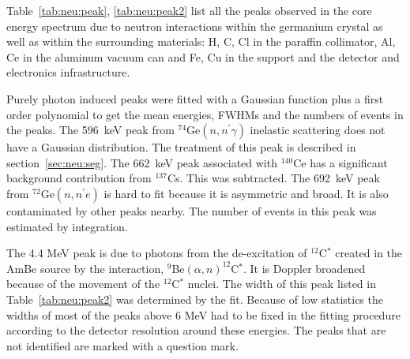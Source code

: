Table~\ref{tab:neu:peak}, \ref{tab:neu:peak2} list all the peaks observed in the core energy spectrum due to neutron interactions within the germanium crystal as well as within the surrounding materials: H, C, Cl in the paraffin collimator, Al, Ce in the aluminum vacuum can and Fe, Cu in the support and the detector and electronics infrastructure.

Purely photon induced peaks were fitted with a Gaussian function plus a first order polynomial to get the mean energies, FWHMs and the numbers of events in the peaks. The 596~keV peak from $^{74}$Ge$(n, n^\prime \gamma)$ inelastic scattering does not have a Gaussian distribution. The treatment of this peak is described in section~\ref{sec:neu:seg}. The 662~keV peak associated with $^{140}$Ce has a significant background contribution from $^{137}$Cs. This was subtracted. The 692~keV peak from $^{72}$Ge$(n,n^\prime e)$ is hard to fit because it is asymmetric and broad. It is also contaminated by other peaks nearby. The number of events in this peak was estimated by integration.

The 4.4 MeV peak is due to photons from the de-excitation of $^{12}$C$^{*}$ created in the AmBe source by the interaction, $^{9}$Be$(\alpha,n)^{12}$C$^{*}$. It is Doppler broadened because of the movement of the $^{12}$C$^{*}$ nuclei. The width of this peak listed in Table~\ref{tab:neu:peak2} was determined by the fit. Because of low statistics the widths of most of the peaks above 6 MeV had to be fixed in the fitting procedure according to the detector resolution around these energies. The peaks that are not identified are marked with a question mark.

